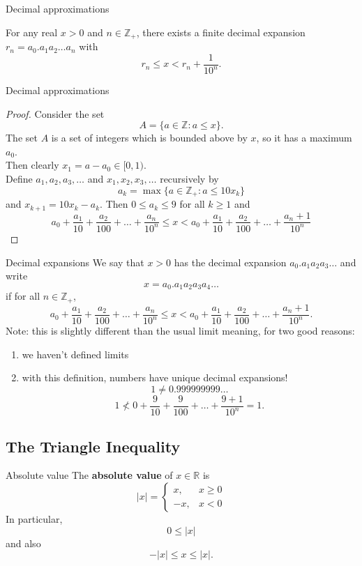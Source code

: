 \documentclass{beamer}
\begin{document}
\begin{frame}{Decimal approximations}
\begin{thm}
For any real $x > 0$ and $n\in \mathbb{Z}_+$, there exists a finite decimal expansion $r_n=a_0.a_1a_2\dots a_n$ with
$$r_n \leq x < r_n + \frac{1}{10^n}.$$
\end{thm}
\end{frame}

\begin{frame}{Decimal approximations}
\begin{proof}
Consider the set
$$A = \{a\in\mathbb{Z}: a\leq x\}.$$
\pause
The set $A$ is a set of integers which is bounded above by $x$, so it has a maximum $a_0$. \\
\pause
Then clearly $x_1 = a-a_0\in [0,1)$. \\
\pause
Define $a_1,a_2,a_3,\dots$ and $x_1,x_2,x_3,\dots$ recursively by
$$a_k = \max\{a\in\mathbb{Z}_+: a\leq 10x_{k}\}$$
and $x_{k+1}=10x_k-a_k$.
\pause
Then $0\leq a_k \leq 9$ for all $k\geq 1$ 
\pause
and 
$$a_0 + \frac{a_1}{10} + \frac{a_2}{100} + \dots + \frac{a_n}{10^n}
\leq x < a_0 + \frac{a_1}{10} + \frac{a_2}{100} + \dots + \frac{a_n+1}{10^n}
$$
\end{proof}
\end{frame}

\begin{frame}{Decimal expansions}
We say that $x>0$ has the decimal expansion $a_0.a_1a_2a_3\dots$ and write
$$x = a_0.a_1a_2a_3a_4\dots$$
\pause
if for all $n\in\mathbb{Z}_+$,
$$a_0 + \frac{a_1}{10} + \frac{a_2}{100} + \dots + \frac{a_n}{10^n}
\leq x < a_0 + \frac{a_1}{10} + \frac{a_2}{100} + \dots + \frac{a_n+1}{10^n}.
$$
\pause
Note: this is slightly different than the usual limit meaning, for two good reasons:
\begin{enumerate}
\pause
\item we haven't defined limits
\pause
\item with this definition, numbers have unique decimal expansions!
\pause
$$1\neq 0.999999999\dots$$
\pause
$$1 \nless 0 + \frac{9}{10} + \frac{9}{100} + \dots + \frac{9+1}{10^n} = 1.$$
\end{enumerate}
\end{frame}

\subsection{The Triangle Inequality}

\begin{frame}{Absolute value}
The \textbf{absolute value} of $x\in \mathbb{R}$ is
$$\lvert x \rvert = \left\lbrace\begin{array}{cc}
 x,& x \geq 0\\
-x,& x < 0
\end{array}\right.$$
In particular,
$$0\leq \lvert x\rvert$$
and also
$$-\lvert x\rvert\leq x \leq \lvert x\rvert.$$
\end{frame}
\end{document}
